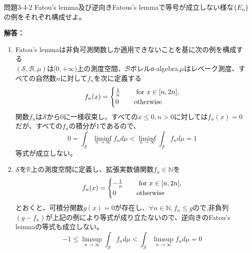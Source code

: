 \documentclass{jsarticle}
\begin{document}
\begin{itembox}[l]{問題3-4-2}
Fatou's lemma及び逆向きFatous's lemmaで等号が成立しない様な$\{E_n\}$の例をそれぞれ構成せよ。
\end{itembox}
{\bf 解答：}
\begin{enumerate}
\item
Fatou's lemmaは非負可測関数しか適用できないことを基に次の例を構成する\\
$(\mathcal{S},\mathcal{B},\mu)$は$[0,+\infty)$上の測度空間、$\mathcal{B}$ボレルσ-algebra,$\mu$はレベーク測度、すべての自然数$n$に対して$f_n$を次に定義する
\[
f_n(x) = \begin{cases}
\frac{1}{n} & \text{\,\,\,\,\,\, for $x \in [n,2n]$}, \\
0 & \text{\,\,\,\,\,\,otherwise}
\end{cases}
\]
関数$f_n$は$\mathcal{S}$から$0$に一様収束し、すべての$x \le 0,n > 0$に対しては$f_n(x)=0$だが、すべての$f_n$の積分が$1$であるので、
\[
0 = \int_{\mathcal{S}} \liminf_{n \to \infty} f_n d\mu < \liminf_{n \to \infty} \int_{\mathcal{S}} f_n d\mu = 1
\]
等式が成立しない。
\item
$\mathcal{S}$を$\mathbb{R}$上の測度空間に定義し、拡張実数値関数$f_n\in \mathbb{N}$を
\[
f_n(x) = \begin{cases}
-\frac{1}{n} & \text{\,\,\,\,\,\, for $x \in [n,2n]$}, \\
0 & \text{\,\,\,\,\,\,otherwise}
\end{cases}
\]
とおくと、可積分関数$g(x)=0$が存在し、$\forall n \in \mathbb{N}, f_n \le g$ので,非負列$(g-f_n)$が上記の例により等式が成り立たないので、逆向きのFatou's lemmaの等式も成立しない。
\[
-1 \le \limsup_{n \to \infty} \int_{\mathcal{S}} f_n d\mu < \int_{\mathcal{S}} \limsup_{n \to \infty} f_n d\mu= 0
\]

\end{enumerate}
\end{document}
